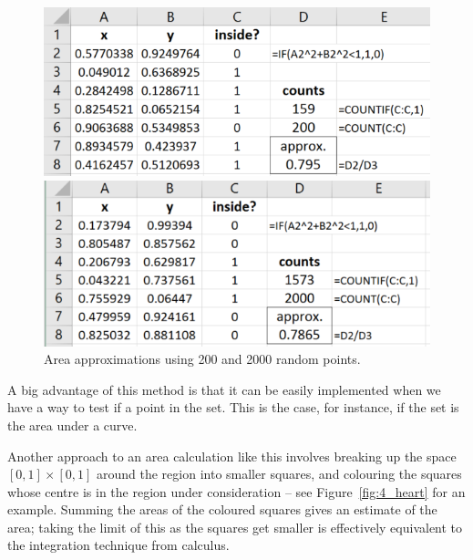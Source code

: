 \begin{figure}[htbp]
    \begin{minipage}{0.45\textwidth}
        \centering
	\includegraphics[width=\linewidth]{fig/4_quartercircle_2.png}
    \end{minipage}
    \hfill
    \begin{minipage}{0.45\textwidth}
        \centering
	\includegraphics[width=\linewidth]{fig/4_quartercircle_3.png}
    \end{minipage}	
    \caption{Area approximations using 200 and 2000 random points. \label{fig:4_quartercircle_23}}
\end{figure}


A big advantage of this method is that it can be easily implemented when we have a way to test if a point in the set.
This is the case, for instance, if the set is the area under a curve.


Another approach to an area calculation like this involves breaking up the space $[0,1]\times[0,1]$ around the region into smaller squares, and colouring the squares whose centre is in the region under consideration -- see Figure~\ref{fig:4_heart} for an example.
Summing the areas of the coloured squares gives an estimate of the area; taking the limit of this as the squares get smaller is effectively equivalent to the integration technique from calculus.


